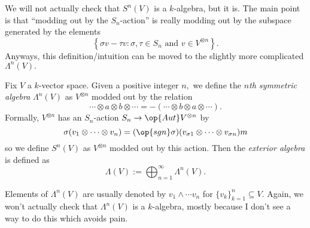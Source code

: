 \documentclass[../notes.tex]{subfiles}
\begin{document}
We will not actually check that $S^n(V)$ is a $k$-algebra, but it is. The main point is that ``modding out by the $S_n$-action'' is really modding out by the subspace generated by the elements
\[\left\{\sigma v-\tau v:\sigma,\tau\in S_n\text{ and }v\in V^{\otimes n}\right\}.\]
Anyways, this definition/intuition can be moved to the slightly more complicated $\Lambda^n(V).$
\begin{definition}
	Fix $V$ a $k$-vector space. Given a positive integer $n,$ we define the \textit{$n$th symmetric algebra} $\Lambda^n(V)$ as $V^{\otimes n}$ modded out by the relation
	\[\cdots\otimes a\otimes b\otimes\cdots=-(\cdots\otimes b\otimes a\otimes\cdots).\]
	Formally, $V^{\otimes n}$ has an $S_n$-action $S_n\to\op{Aut}V^{\otimes n}$ by
	\[\sigma(v_1\otimes\cdots\otimes v_n)=(\op{sgn}\sigma)(v_{\sigma1}\otimes\cdots\otimes v_{\sigma n})m\]
	so we define $S^n(V)$ as $V^{\otimes n}$ modded out by this action. Then the \textit{exterior algebra} is defined as
	\[\Lambda(V):=\bigoplus_{n=1}^\infty\Lambda^n(V).\]
\end{definition}
Elements of $\Lambda^n(V)$ are usually denoted by $v_1\wedge\cdots v_n$ for $\{v_k\}_{k=1}^n\subseteq V.$ Again, we won't actually check that $\Lambda^n(V)$ is a $k$-algebra, mostly because I don't see a way to do this which avoids pain.
\end{document}
